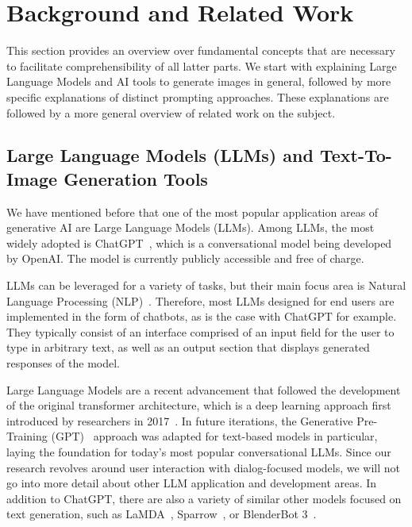 \section{Background and Related Work}
\label{sec:background-and-related-work}

This section provides an overview over fundamental concepts that are necessary to
facilitate comprehensibility of all latter parts.
We start with explaining Large Language Models and AI tools to generate images in general, followed
by more specific explanations of distinct prompting approaches.
These explanations are followed by a more general overview of related work on the subject.


\subsection{Large Language Models (LLMs) and Text-To-Image Generation Tools}
\label{subsec:large-language-models-(llms)}
We have mentioned before that one of the most popular application areas of generative AI
are Large Language Models (LLMs).
Among LLMs, the most widely adopted is ChatGPT~\cite{openai_chatgpt_2023}, which is a
conversational model being developed by OpenAI\@.
The model is currently publicly accessible and free of charge.

LLMs can be leveraged for a variety of tasks, but their main focus area is Natural Language Processing
(NLP)~\cite{radford_language_2018}.
Therefore, most LLMs designed for end users are implemented in the form of chatbots,
as is the case with ChatGPT for example.
They typically consist of an interface comprised of an input field for the user to type in arbitrary
text, as well as an output section that displays generated responses of the model.

Large Language Models are a recent advancement that followed the development of the original
transformer architecture, which is a deep learning approach first introduced by researchers in 2017~\cite{vaswani_attention_2017}.
In future iterations, the Generative Pre-Training (GPT)~\cite{radford_improving_2018} approach
was adapted for text-based models in particular, laying the foundation for today's most
popular conversational LLMs.
Since our research revolves around user interaction with dialog-focused models, we will not go into
more detail about other LLM application and development areas.
In addition to ChatGPT, there are also a variety of similar other models focused on text generation,
such as LaMDA~\cite{thoppilan_lamda_2022}, Sparrow~\cite{glaese_improving_2022}, or
BlenderBot 3~\cite{shuster_blenderbot_2022}.
\newline

